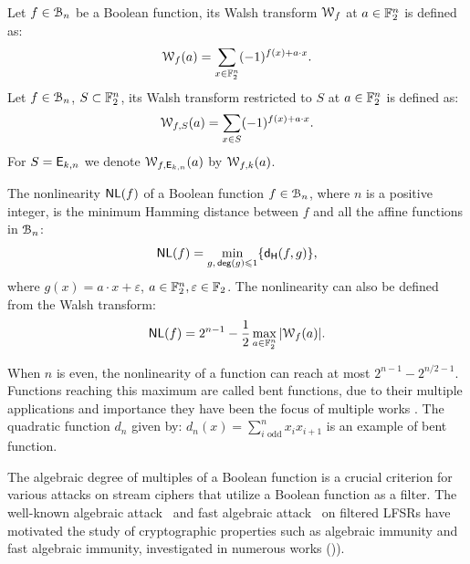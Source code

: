 \documentclass[11pt]{llncs}
\begin{document}
\begin{definition}\label{def:walsh_transform}
	Let $f\in \mathcal{B}_{n}$ be a Boolean function, its Walsh transform $\mathcal W_{f}$ at $a \in \mathbb{F}_2^n$ is defined as:
	\[  \mathcal W_{f} (a) = \sum_{x \in \mathbb{F}_2^n} (-1)^{f(x) +  a \cdot x }.\]
	Let $f\in \mathcal{B}_{n}$, $S \subset \mathbb{F}_2^n$, its Walsh transform restricted to $S$ at $a \in \mathbb{F}_2^n$ is defined as:
	\[  \mathcal W_{f,S} (a) = \sum_{x\in S} (-1)^{f(x)+a \cdot x}.\]
	For $S=\mathsf{E}_{k,n}$ we denote $\mathcal W_{f,\mathsf{E}_{k,n}} (a)$ by $\mathcal{W}_{f,k}(a)$.%
\end{definition}


	


\begin{definition}[Nonlinearity]%
	\label{def:nl}
	The nonlinearity $\mathsf{NL}(f)$ of a Boolean function $f\in \mathcal{B}_n$, where $n$ is a positive integer, is the minimum Hamming distance between $f$ and all the affine functions in $\mathcal{B}_n$:
	\[ \mathsf{NL}(f) = \min_{g,\, \mathsf{deg}(g)\leqslant 1} \{ \mathsf{d_H}(f,g) \}{,} \]
	where $g(x)=a\cdot x+\varepsilon$, $a\in \mathbb{F}_2^n, \varepsilon\in \mathbb{F}_2$. 	
	The nonlinearity can also be defined from the Walsh transform:
	\[ \mathsf{NL}(f) = 2^{n-1}- \frac{1}{2} \max_{a\in \mathbb{F}_2^n}{|\mathcal W_{f}(a)|}. \]
\end{definition}

When $n$ is even, the nonlinearity of a function can reach at most $2^{n-1}-2^{n/2 -1}$. Functions reaching this maximum are called bent functions, due to their multiple applications and importance they have been the focus of multiple works \eg \cite{Rothaus76,FSE:Dobbertin95,DBLP:conf/itw/BudaghyanCH11,Tokareva15,Mesnager16}. 
The quadratic function $d_n$ given by: $d_n(x)=\sum_{i \text{ odd}}^n x_i x_{i+1}$ is an example of bent function.


The algebraic degree of multiples of a Boolean function is a crucial criterion for various attacks on stream ciphers that utilize a Boolean function as a filter. The well-known algebraic attack~\cite{EC:CouMei03} and fast algebraic attack~\cite{C:Courtois03} on filtered LFSRs have motivated the study of cryptographic properties such as algebraic immunity and fast algebraic immunity, investigated in numerous works (\eg \cite{C:HawRos04,ISC:JiaZhaWan13})). 
\end{document}
